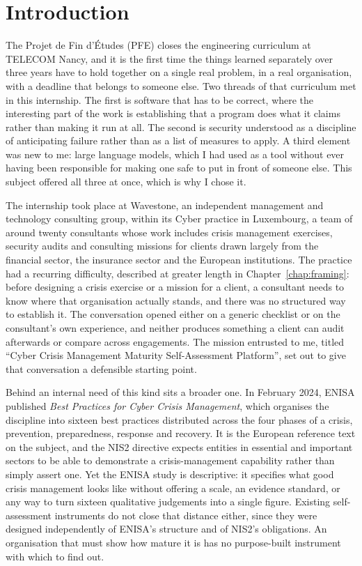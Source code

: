 \chapter*{Introduction}
\label{chap:introduction}

The Projet de Fin d'\'Etudes (PFE) closes the engineering curriculum at TELECOM
Nancy, and it is the first time the things learned separately over three years
have to hold together on a single real problem, in a real organisation, with a
deadline that belongs to someone else. Two threads of that curriculum met in
this internship. The first is software that has to be correct, where the
interesting part of the work is establishing that a program does what it claims
rather than making it run at all. The second is security understood as a
discipline of anticipating failure rather than as a list of measures to apply.
A third element was new to me: large language models, which I had used as a
tool without ever having been responsible for making one safe to put in front
of someone else. This subject offered all three at once, which is why I chose
it.

The internship took place at Wavestone, an independent management and
technology consulting group, within its Cyber practice in Luxembourg, a team of
around twenty consultants whose work includes crisis management exercises,
security audits and consulting missions for clients drawn largely from the
financial sector, the insurance sector and the European institutions. The
practice had a recurring difficulty, described at greater length in
Chapter~\ref{chap:framing}: before designing a crisis exercise or a mission for
a client, a consultant needs to know where that organisation actually stands,
and there was no structured way to establish it. The conversation opened either
on a generic checklist or on the consultant's own experience, and neither
produces something a client can audit afterwards or compare across engagements.
The mission entrusted to me, titled ``Cyber Crisis Management Maturity
Self-Assessment Platform'', set out to give that conversation a defensible
starting point.

Behind an internal need of this kind sits a broader one. In February 2024,
ENISA published \emph{Best Practices for Cyber Crisis Management}, which
organises the discipline into sixteen best practices distributed across the
four phases of a crisis, prevention, preparedness, response and recovery. It is
the European reference text on the subject, and the NIS2 directive expects
entities in essential and important sectors to be able to demonstrate a
crisis-management capability rather than simply assert one. Yet the ENISA study
is descriptive: it specifies what good crisis management looks like without
offering a scale, an evidence standard, or any way to turn sixteen qualitative
judgements into a single figure. Existing self-assessment instruments do not
close that distance either, since they were designed independently of ENISA's
structure and of NIS2's obligations. An organisation that must show how mature
it is has no purpose-built instrument with which to find out.

